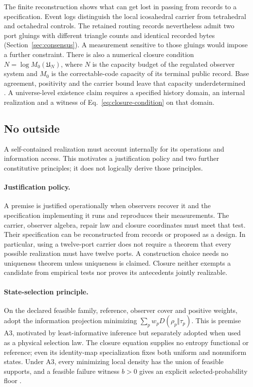 \documentclass[11pt]{article}
\theoremstyle{definition}
\theoremstyle{remark}
\begin{document}
The finite reconstruction shows what can get lost in passing from
records to a specification. Event logs distinguish the local
icosahedral carrier from tetrahedral and octahedral controls. The
retained routing records nevertheless admit two port gluings with
different triangle counts and identical recorded bytes
(Section~\ref{sec:consensus}). A measurement sensitive to those gluings
would impose a further constraint. There is also a numerical closure
condition $N=\log M_0(\mathfrak U_N)$, where $N$ is the capacity budget
of the regulated observer system and $M_0$ is the correctable-code
capacity of its terminal public record. Base agreement, positivity and
the carrier bound leave that capacity underdetermined
\cite{ophobservers}. A universe-level existence claim requires a
specified history domain, an internal realization and a witness of
Eq.~\eqref{eq:closure-condition} on that domain.

\subsection{No outside}
\label{sec:no-outside}

A self-contained realization must account internally for its operations and
information access. This motivates a justification policy and two further
constitutive principles; it does not logically derive those principles.

\paragraph{Justification policy.} A premise is justified operationally when
observers recover it and the specification implementing it runs and
reproduces their measurements. The carrier, observer algebra, repair law and
closure coordinates must meet that test. Their specification can be
reconstructed from records or proposed as a design. In particular, using
a twelve-port carrier does not require a theorem that every possible
realization must have twelve ports. A construction choice needs no
uniqueness theorem unless uniqueness is claimed. Closure neither exempts a
candidate from empirical tests nor proves its antecedents jointly realizable.

\paragraph{State-selection principle.} On the declared feasible family,
reference, observer cover and positive weights, adopt the information
projection minimizing $\sum_pw_pD(\rho_p\Vert\tau_p)$. This is premise A3,
motivated by least-informative inference but separately adopted when used
as a physical selection law. The closure equation supplies no entropy
functional or reference; even its identity-map specialization fixes both
uniform and nonuniform states. Under A3, every minimizing local density has
the union of feasible supports, and a feasible failure witness $b>0$ gives
an explicit selected-probability floor \cite{ophEinstein}.
\end{document}
